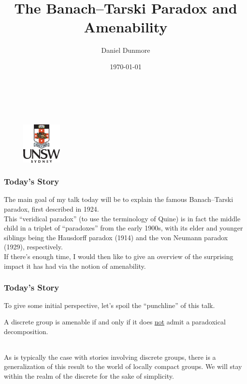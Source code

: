 \documentclass{beamer}
\title[The Banach--Tarski Paradox and Amenability]{The Banach--Tarski Paradox and Amenability}
\author{Daniel Dunmore}
\institute[UNSW]{
	University of New South Wales \\
	\medskip
	\textit{d.dunmore@unsw.edu.au}
}
\date{\today}
\begin{document}

\begin{frame}
\noindent\\[-20pt]
\begin{figure}[!ht]
\titlepage
\noindent\\[-20pt]
\hspace{3.5cm}\hfill\includegraphics[width=2cm]{unsw-crest}\hfill{}
\end{figure}
\end{frame}

\begin{frame}
\frametitle{Today's Story}
\noindent The main goal of my talk today will be to explain the famous Banach--Tarski paradox, first described in 1924.\\[\baselineskip]%

\noindent This ``veridical paradox'' (to use the terminology of Quine) is in fact the middle child in a triplet of ``paradoxes'' from the early 1900s, with its elder and younger siblings being the Hausdorff paradox (1914) and the von Neumann paradox (1929), respectively.\\[\baselineskip]%

\noindent If there's enough time, I would then like to give an overview of the surprising impact it has had via the notion of amenability.
\end{frame}

\begin{frame}
\frametitle{Today's Story}
\noindent To give some initial perspective, let's spoil the ``punchline'' of this talk.\\[0.5\baselineskip]

\begin{theorem}
A discrete group is amenable if and only if it does \underline{not} admit a paradoxical decomposition.
\end{theorem}

\noindent\\[0.5\baselineskip] As is typically the case with stories involving discrete groups, there is a generalization of this result to the world of locally compact groups. We will stay within the realm of the discrete for the sake of simplicity.
\end{frame}
\end{document}
